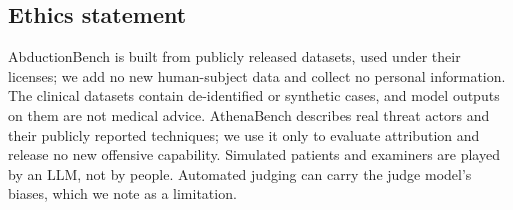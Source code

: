 \subsection*{Ethics statement}

AbductionBench is built from publicly released datasets, used under their licenses; we add no new human-subject data and collect no personal information. The clinical datasets contain de-identified or synthetic cases, and model outputs on them are not medical advice. AthenaBench describes real threat actors and their publicly reported techniques; we use it only to evaluate attribution and release no new offensive capability. Simulated patients and examiners are played by an LLM, not by people. Automated judging can carry the judge model's biases, which we note as a limitation.
